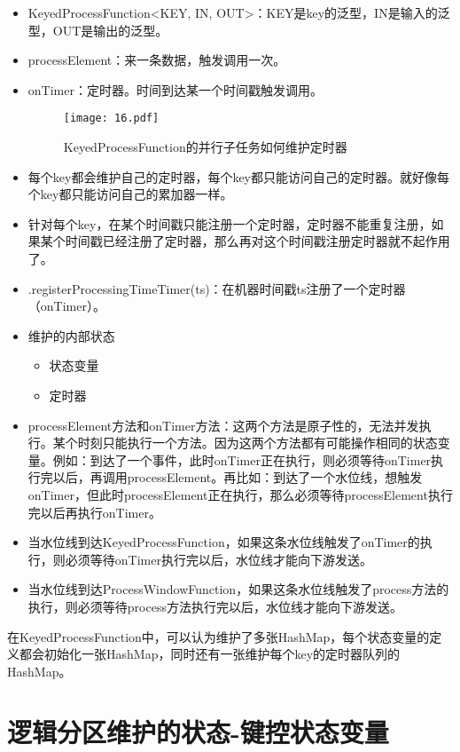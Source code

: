 \documentclass[cn,11pt,chinese]{elegantbook}
\begin{document}
\begin{itemize}
  \item KeyedProcessFunction<KEY, IN, OUT>：KEY是key的泛型，IN是输入的泛型，OUT是输出的泛型。
  \item processElement：来一条数据，触发调用一次。
  \item onTimer：定时器。时间到达某一个时间戳触发调用。
  \begin{figure}[htbp]
    \centering
    \texttt{[image: 16.pdf]}
    \caption{KeyedProcessFunction的并行子任务如何维护定时器}
  \end{figure}
  \item 每个key都会维护自己的定时器，每个key都只能访问自己的定时器。就好像每个key都只能访问自己的累加器一样。
  \item 针对每个key，在某个时间戳只能注册一个定时器，定时器不能重复注册，如果某个时间戳已经注册了定时器，那么再对这个时间戳注册定时器就不起作用了。
  \item .registerProcessingTimeTimer(ts)：在机器时间戳ts注册了一个定时器（onTimer）。
  \item 维护的内部状态
    \begin{itemize}
      \item 状态变量
      \item 定时器
    \end{itemize}
  \item processElement方法和onTimer方法：这两个方法是原子性的，无法并发执行。某个时刻只能执行一个方法。因为这两个方法都有可能操作相同的状态变量。例如：到达了一个事件，此时onTimer正在执行，则必须等待onTimer执行完以后，再调用processElement。再比如：到达了一个水位线，想触发onTimer，但此时processElement正在执行，那么必须等待processElement执行完以后再执行onTimer。
  \item 当水位线到达KeyedProcessFunction，如果这条水位线触发了onTimer的执行，则必须等待onTimer执行完以后，水位线才能向下游发送。
  \item 当水位线到达ProcessWindowFunction，如果这条水位线触发了process方法的执行，则必须等待process方法执行完以后，水位线才能向下游发送。
\end{itemize}

\begin{note}
  在KeyedProcessFunction中，可以认为维护了多张HashMap，每个状态变量的定义都会初始化一张HashMap，同时还有一张维护每个key的定时器队列的HashMap。
\end{note}

\section{逻辑分区维护的状态-键控状态变量}
\end{document}
